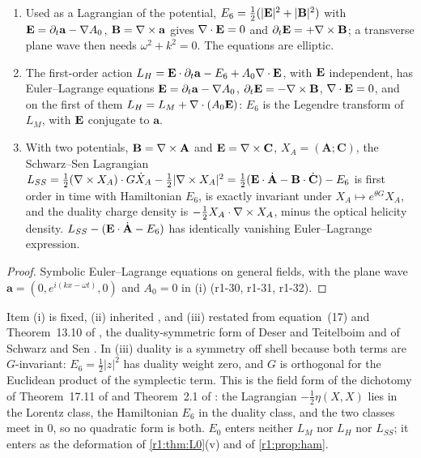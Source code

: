 \begin{proposition}
\label{r1:prop:E6}
\begin{enumerate}[label=(\roman*),leftmargin=2.2em]
\item Used as a Lagrangian of the potential, $E_6=\tfrac12(|\mathbf E|^2+|\mathbf B|^2)$ with $\mathbf E=\partial_t\mathbf a-\nabla A_0$, $\mathbf B=\nabla\times\mathbf a$
gives $\nabla\cdot\mathbf E=0$ and $\partial_t\mathbf E=+\nabla\times\mathbf B$; a transverse plane wave then needs $\omega^2+k^2=0$. The equations are elliptic.
\item The first-order action $L_H=\mathbf E\cdot\partial_t\mathbf a-E_6+A_0\nabla\cdot\mathbf E$, with $\mathbf E$ independent, has Euler--Lagrange equations
$\mathbf E=\partial_t\mathbf a-\nabla A_0$, $\partial_t\mathbf E=-\nabla\times\mathbf B$, $\nabla\cdot\mathbf E=0$, and on the first of them
$L_H=L_M+\nabla\cdot(A_0\mathbf E)$: $E_6$ is the Legendre transform of $L_M$, with $\mathbf E$ conjugate to $\mathbf a$.
\item With two potentials, $\mathbf B=\nabla\times\mathbf A$ and $\mathbf E=\nabla\times\mathbf C$, $X_A=(\mathbf A;\mathbf C)$, the Schwarz--Sen Lagrangian
$L_{SS}=\tfrac12(\nabla\times X_A)\cdot G\dot X_A-\tfrac12|\nabla\times X_A|^2=\tfrac12(\mathbf E\cdot\dot{\mathbf A}-\mathbf B\cdot\dot{\mathbf C})-E_6$ is first order in
time with Hamiltonian $E_6$, is exactly invariant under $X_A\mapsto e^{\theta G}X_A$, and the duality charge density is
$-\tfrac12X_A\cdot\nabla\times X_A$, minus the optical helicity density. $L_{SS}-(\mathbf E\cdot\dot{\mathbf A}-E_6)$ has identically vanishing
Euler--Lagrange expression.
\end{enumerate}
\end{proposition}

\begin{proof}
Symbolic Euler--Lagrange equations on general fields, with the plane wave $\mathbf a=(0,e^{i(kx-\omega t)},0)$ and $A_0=0$ in (i)
(r1-30, r1-31, r1-32).
\end{proof}

Item (i) is fixed, (ii) inherited \cite{HenneauxTeitelboim92}, and (iii) restated from equation~(17) and Theorem~13.10 of \cite{ES17}, the
duality-symmetric form of Deser and Teitelboim and of Schwarz and Sen \cite{DeserTeitelboim76,SchwarzSen94}. In (iii) duality is a symmetry
off shell because both terms are $G$-invariant: $E_6=\tfrac12|z|^2$ has duality weight zero, and $G$ is orthogonal for the Euclidean product
of the symplectic term. This is the field form of the dichotomy of Theorem~17.11 of \cite{ES17} and Theorem~2.1 of \cite{RE}: the Lagrangian
$-\tfrac12\eta(X,X)$ lies in the Lorentz class, the Hamiltonian $E_6$ in the duality class, and the two classes meet in $0$, so no quadratic
form is both. $E_0$ enters neither $L_M$ nor $L_H$ nor $L_{SS}$; it enters as the deformation of \cref{r1:thm:L0}(v) and of
\cref{r1:prop:ham}.


